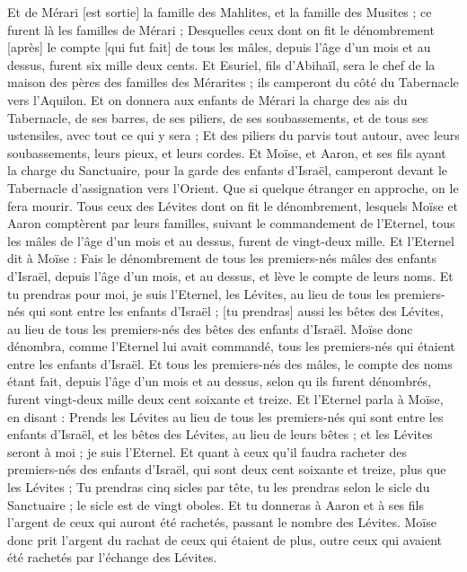 \begin{multicols}{2}
Et de Mérari [est sortie] la famille des Mahlites, et la famille des Musites ; ce furent là les familles de Mérari ;
Desquelles ceux dont on fit le dénombrement [après] le compte [qui fut fait] de tous les mâles, depuis l'âge d'un mois et au dessus, furent six mille deux cents.
Et Esuriel, fils d'Abihaïl, sera le chef de la maison des pères des familles des Mérarites ; ils camperont du côté du Tabernacle vers l'Aquilon.
Et on donnera aux enfants de Mérari la charge des ais du Tabernacle, de ses barres, de ses piliers, de ses soubassements, et de tous ses ustensiles, avec tout ce qui y sera ;
Et des piliers du parvis tout autour, avec leurs soubassements, leurs pieux, et leurs cordes.
Et Moïse, et Aaron, et ses fils ayant la charge du Sanctuaire, pour la garde des enfants d'Israël, camperont devant le Tabernacle d'assignation vers l'Orient. Que si quelque étranger en approche, on le fera mourir.
Tous ceux des Lévites dont on fit le dénombrement, lesquels Moïse et Aaron comptèrent par leurs familles, suivant le commandement de l'Eternel, tous les mâles de l'âge d'un mois et au dessus, furent de vingt-deux mille.
Et l'Eternel dit à Moïse : Fais le dénombrement de tous les premiers-nés mâles des enfants d'Israël, depuis l'âge d'un mois, et au dessus, et lève le compte de leurs noms.
Et tu prendras pour moi, je suis l'Eternel, les Lévites, au lieu de tous les premiers-nés qui sont entre les enfants d'Israël ; [tu prendras] aussi les bêtes des Lévites, au lieu de tous les premiers-nés des bêtes des enfants d'Israël.
Moïse donc dénombra, comme l'Eternel lui avait commandé, tous les premiers-nés qui étaient entre les enfants d'Israël.
Et tous les premiers-nés des mâles, le compte des noms étant fait, depuis l'âge d'un mois et au dessus, selon qu ils furent dénombrés, furent vingt-deux mille deux cent soixante et treize.
Et l'Eternel parla à Moïse, en disant :
Prends les Lévites au lieu de tous les premiers-nés qui sont entre les enfants d'Israël, et les bêtes des Lévites, au lieu de leurs bêtes ; et les Lévites seront à moi ; je suis l'Eternel.
Et quant à ceux qu'il faudra racheter des premiers-nés des enfants d'Israël, qui sont deux cent soixante et treize, plus que les Lévites ;
Tu prendras cinq sicles par tête, tu les prendras selon le sicle du Sanctuaire ; le sicle est de vingt oboles.
Et tu donneras à Aaron et à ses fils l'argent de ceux qui auront été rachetés, passant le nombre des Lévites.
Moïse donc prit l'argent du rachat de ceux qui étaient de plus, outre ceux qui avaient été rachetés par l'échange des Lévites.

\end{multicols}
